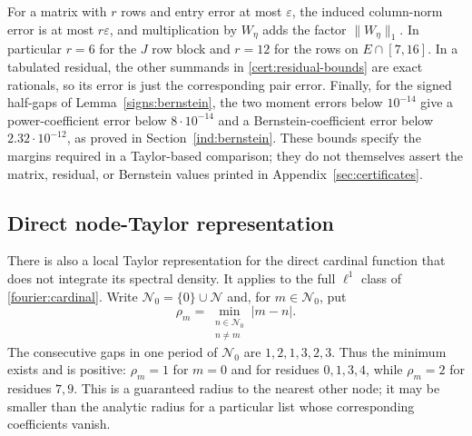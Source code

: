 For a matrix with $r$ rows and entry error at most $\varepsilon$, the
induced column-norm error is at most $r\varepsilon$, and multiplication
by $W_\eta$ adds the factor $\|W_\eta\|_1$.  In particular $r=6$ for the
$J$ row block and $r=12$ for the rows on $E\cap[7,16]$.  In a tabulated
residual, the other summands in \eqref{cert:residual-bounds} are exact
rationals, so its error is just the corresponding pair error.  Finally,
for the signed half-gaps of Lemma~\ref{signs:bernstein}, the two moment
errors below $10^{-14}$ give a power-coefficient error below
$8\cdot10^{-14}$ and a Bernstein-coefficient error below
$2.32\cdot10^{-12}$, as proved in Section~\ref{ind:bernstein}.
These bounds specify the margins required in a Taylor-based comparison;
they do not themselves assert the matrix, residual, or Bernstein values
printed in Appendix~\ref{sec:certificates}.

\subsection{Direct node-Taylor representation}\label{ind:node-taylor}

There is also a local Taylor representation for the direct cardinal
function that does not integrate its spectral density.  It applies to
the full $\ell^1$ class of \eqref{fourier:cardinal}.  Write
$\mathcal N_0=\{0\}\cup\mathcal N$ and, for $m\in\mathcal N_0$, put
\begin{equation}\label{ind:node-radius}
 \rho_m=\min_{\substack{n\in\mathcal N_0\\n\ne m}}|m-n|.
\end{equation}
The consecutive gaps in one period of $\mathcal N_0$ are
$1,2,1,3,2,3$.  Thus the minimum exists and is positive:
$\rho_m=1$ for $m=0$ and for residues $0,1,3,4$, while $\rho_m=2$
for residues $7,9$.  This is a guaranteed radius to the nearest other
node; it may be smaller than the analytic radius for a particular list
whose corresponding coefficients vanish.

